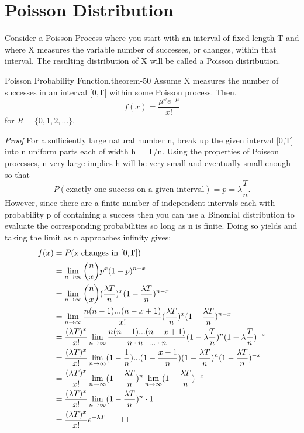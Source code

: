 \documentclass[10pt,]{book}
\makeatletter
\renewcommand*{\proofname}{Proof}
\renewenvironment{proof}[1][\proofname]{\par
  \pushQED{\qed}%
  \normalfont \topsep6\p@\@plus6\p@\relax
  \trivlist
  \item\relax
    {\itshape
    #1\@addpunct{.}}\hspace\labelsep\ignorespaces
}{%
  \popQED\endtrivlist\@endpefalse
}
\numberwithin{equation}{section}
\makeatother
\begin{document}
\section[{Poisson Distribution}]{Poisson Distribution}\label{section-52}
\hypertarget{p-1037}{}%
Consider a Poisson Process where you start with an interval of fixed length T and where X measures the variable number of successes, or changes, within that interval. The resulting distribution of X will be called a Poisson distribution.%
\par
\hypertarget{p-1038}{}%
\begin{theorem}{Poisson Probability Function.}{}{theorem-50}%
\hypertarget{p-1039}{}%
Assume X measures the number of successes in an interval [0,T] within some Poisson process. Then,%
\begin{equation*}
f(x) = \frac{\mu^x e^{-\mu}}{x!}
\end{equation*}
for \(R = \{ 0, 1, 2, ... \}\).%
\end{theorem}
\begin{proof}\hypertarget{proof-53}{}
\hypertarget{p-1040}{}%
For a sufficiently large natural number n, break up the given interval [0,T] into n uniform parts each of width h = T/n.  Using the properties of Poisson processes, n very large implies h will be very small and eventually small enough so that%
\begin{equation*}
P(\text{exactly one success on a given interval}) = p = \lambda \frac{T}{n}.
\end{equation*}
However, since there are a finite number of independent intervals each with probability p of containing a success then you can use a Binomial distribution to evaluate the corresponding probabilities so long as n is finite. Doing so yields and taking the limit as n approaches infinity gives:%
\begin{align*}
f(x) & = P(\text{x changes in [0,T]}) \\
& = \lim_{n \rightarrow \infty} \binom{n}{x} p^x (1-p)^{n-x}\\
& = \lim_{n \rightarrow \infty} \binom{n}{x} (\frac{\lambda T}{n})^x (1-\frac{\lambda T}{n})^{n-x}\\
& = \lim_{n \rightarrow \infty} \frac{n(n-1)...(n-x+1)}{x!} ( \frac{\lambda T}{n})^x (1- \frac{\lambda T}{n})^{n-x}\\
& = \frac{(\lambda T)^x}{x!} \lim_{n \rightarrow \infty} \frac{n(n-1)...(n-x+1)}{n \cdot n \cdot ... \cdot n} (1-\lambda \frac{T}{n})^{n}(1-\lambda \frac{T}{n})^{-x}\\
& = \frac{(\lambda T)^x}{x!} \lim_{n \rightarrow \infty} (1-\frac{1}{n})...(1-\frac{x-1}{n})  (1- \frac{\lambda T}{n})^{n}(1- \frac{\lambda T}{n})^{-x}\\
& = \frac{(\lambda T)^x}{x!} 
\lim_{n \rightarrow \infty} (1- \frac{\lambda T}{n})^{n}
\lim_{n \rightarrow \infty} (1- \frac{\lambda T}{n})^{-x}\\
& = \frac{(\lambda T)^x}{x!} 
\lim_{n \rightarrow \infty} (1- \frac{\lambda T}{n})^{n} \cdot 1\\
& = \frac{(\lambda T)^x}{x!} 
e^{-\lambda T}\qedhere
\end{align*}
%
\end{proof}
\end{document}
